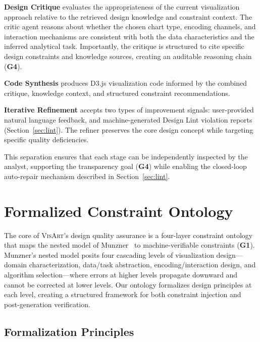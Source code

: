 \documentclass[final,5p,times,twocolumn]{elsarticle}
\newcommand{\sysname}{\textsc{VisArt}}
\begin{document}
\textbf{Design Critique} evaluates the appropriateness of the current visualization approach relative to the retrieved design knowledge and constraint context. The critic agent reasons about whether the chosen chart type, encoding channels, and interaction mechanisms are consistent with both the data characteristics and the inferred analytical task. Importantly, the critique is structured to cite specific design constraints and knowledge sources, creating an auditable reasoning chain (\textbf{G4}).

\textbf{Code Synthesis} produces D3.js visualization code informed by the combined critique, knowledge context, and structured constraint recommendations.

\textbf{Iterative Refinement} accepts two types of improvement signals: user-provided natural language feedback, and machine-generated Design Lint violation reports (Section~\ref{sec:lint}). The refiner preserves the core design concept while targeting specific quality deficiencies.

This separation ensures that each stage can be independently inspected by the analyst, supporting the transparency goal (\textbf{G4}) while enabling the closed-loop auto-repair mechanism described in Section~\ref{sec:lint}.


\section{Formalized Constraint Ontology}
\label{sec:ontology}

The core of \sysname{}'s design quality assurance is a four-layer constraint ontology that maps the nested model of Munzner~\cite{munzner2014visualization} to machine-verifiable constraints (\textbf{G1}). Munzner's nested model posits four cascading levels of visualization design---domain characterization, data/task abstraction, encoding/interaction design, and algorithm selection---where errors at higher levels propagate downward and cannot be corrected at lower levels. Our ontology formalizes design principles at each level, creating a structured framework for both constraint injection and post-generation verification.

\subsection{Formalization Principles}
\end{document}
